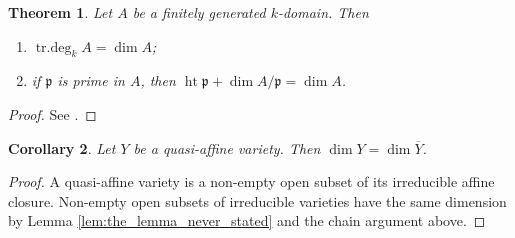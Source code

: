\documentclass[12pt]{article}
\theoremstyle{plain}
\newtheorem{thm}{Theorem}[subsection] %
\newtheorem{cor}[thm]{Corollary}
\theoremstyle{definition}
\begin{document}
\begin{thm}\label{thm:onepointeight}
Let $A$ be a finitely generated $k$-domain. Then
\begin{enumerate}
\item $\operatorname{tr.deg}_k A=\dim A$;
\item if $\mathfrak p$ is prime in $A$, then $\operatorname{ht}\mathfrak p+\dim A/\mathfrak p=\dim A$.
\end{enumerate}
\end{thm}
\begin{proof}
See \cite{algebra}.
\end{proof}
\begin{cor}\label{lem:quasi_dimension}
Let $Y$ be a quasi-affine variety. Then $\dim Y=\dim\overline Y$.
\end{cor}
\begin{proof}
A quasi-affine variety is a non-empty open subset of its irreducible affine closure. Non-empty open subsets of irreducible varieties have the same dimension by Lemma \ref{lem:the_lemma_never_stated} and the chain argument above.
\end{proof}
\end{document}
